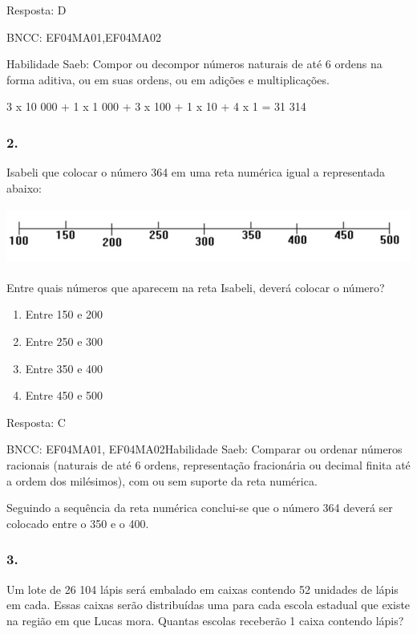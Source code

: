 Resposta: D

BNCC: EF04MA01,EF04MA02

Habilidade Saeb: Compor ou decompor números naturais de até 6 ordens na
forma aditiva, ou em suas ordens, ou em adições e multiplicações.

3 x 10 000 + 1 x 1 000 + 3 x 100 + 1 x 10 + 4 x 1 = 31 314

\subsubsection{2.}\label{section-158}

Isabeli que colocar o número 364 em uma reta numérica igual a
representada abaixo:

\includegraphics[width=5.90556in,height=0.74931in]{media/image153.png}

Entre quais números que aparecem na reta Isabeli, deverá colocar o
número?

\begin{enumerate}
\def\labelenumi{\alph{enumi})}
\item
  Entre 150 e 200
\item
  Entre 250 e 300
\item
  Entre 350 e 400
\item
  Entre 450 e 500
\end{enumerate}

Resposta: C

BNCC: EF04MA01, EF04MA02Habilidade Saeb: Comparar ou ordenar números
racionais (naturais de até 6 ordens, representação fracionária ou
decimal finita até a ordem dos milésimos), com ou sem suporte da reta
numérica.

Seguindo a sequência da reta numérica conclui-se que o número 364 deverá
ser colocado entre o 350 e o 400.

\subsubsection{3.}\label{section-159}

Um lote de 26 104 lápis será embalado em caixas contendo 52 unidades de
lápis em cada. Essas caixas serão distribuídas uma para cada escola
estadual que existe na região em que Lucas mora. Quantas escolas
receberão 1 caixa contendo lápis?

